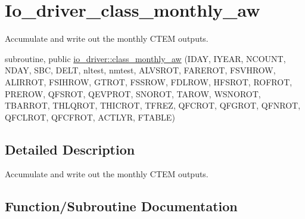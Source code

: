 \hypertarget{group__io__driver__class__monthly__aw}{}\section{Io\+\_\+driver\+\_\+class\+\_\+monthly\+\_\+aw}
\label{group__io__driver__class__monthly__aw}


Accumulate and write out the monthly C\+T\+E\+M outputs.  


\begin{DoxyCompactItemize}
\item 
subroutine, public \hyperlink{group__io__driver__class__monthly__aw_ga74bdc0fab9f9ccf2d9189b56a514ed6d}{io\+\_\+driver\+::class\+\_\+monthly\+\_\+aw} (I\+D\+A\+Y, I\+Y\+E\+A\+R, N\+C\+O\+U\+N\+T, N\+D\+A\+Y, S\+B\+C, D\+E\+L\+T, nltest, nmtest, A\+L\+V\+S\+R\+O\+T, F\+A\+R\+E\+R\+O\+T, F\+S\+V\+H\+R\+O\+W, A\+L\+I\+R\+R\+O\+T, F\+S\+I\+H\+R\+O\+W, G\+T\+R\+O\+T, F\+S\+S\+R\+O\+W, F\+D\+L\+R\+O\+W, H\+F\+S\+R\+O\+T, R\+O\+F\+R\+O\+T, P\+R\+E\+R\+O\+W, Q\+F\+S\+R\+O\+T, Q\+E\+V\+P\+R\+O\+T, S\+N\+O\+R\+O\+T, T\+A\+R\+O\+W, W\+S\+N\+O\+R\+O\+T, T\+B\+A\+R\+R\+O\+T, T\+H\+L\+Q\+R\+O\+T, T\+H\+I\+C\+R\+O\+T, T\+F\+R\+E\+Z, Q\+F\+C\+R\+O\+T, Q\+F\+G\+R\+O\+T, Q\+F\+N\+R\+O\+T, Q\+F\+C\+L\+R\+O\+T, Q\+F\+C\+F\+R\+O\+T, A\+C\+T\+L\+Y\+R, F\+T\+A\+B\+L\+E)
\end{DoxyCompactItemize}


\subsection{Detailed Description}
Accumulate and write out the monthly C\+T\+E\+M outputs. 



\subsection{Function/\+Subroutine Documentation}
\hypertarget{group__io__driver__class__monthly__aw_ga74bdc0fab9f9ccf2d9189b56a514ed6d}{}

